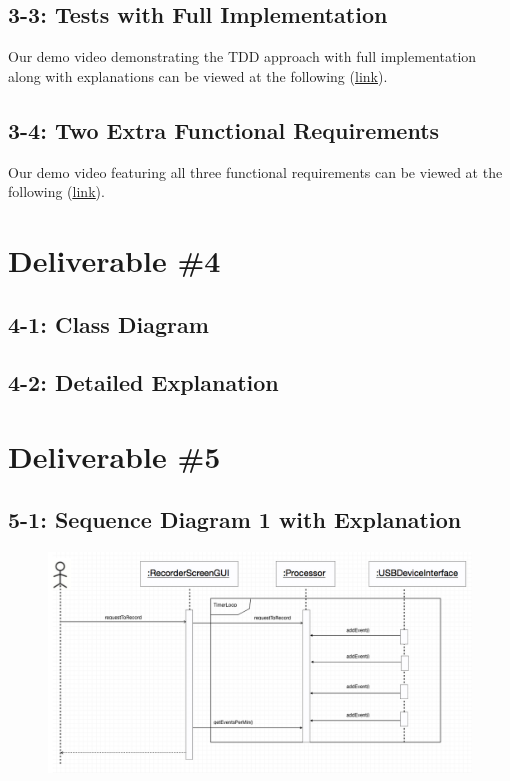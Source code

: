 \documentclass[11pt,a4paper]{article}
\begin{document}
\subsection*{3-3: Tests with Full Implementation}

Our demo video demonstrating the TDD approach with full implementation along with explanations can be viewed at the following (\href{https://www.youtube.com/watch?v=h2C-4-hQrhM&feature=youtu.be}{\underline{link}}).

\subsection*{3-4: Two Extra Functional Requirements}

Our demo video featuring all three functional requirements can be viewed at the following (\href{https://drive.google.com/file/d/1hGAfxo0Bnyy5d5u16bPnoJyps9X3MBN_/view?usp=sharing}{\underline{link}}).



\newpage


\section*{Deliverable \#4}

\subsection*{4-1: Class Diagram}

\subsection*{4-2: Detailed Explanation}

\newpage

\section*{Deliverable \#5}

\subsection*{5-1: Sequence Diagram 1 with Explanation}

\begin{figure}[h] \centering
	\includegraphics[width=1.1\textwidth]{sequence1.png}
\end{figure}
\end{document}
